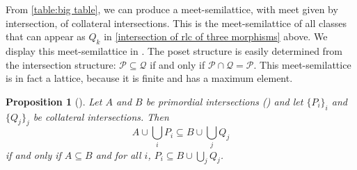 \documentclass{amsart}
\newcommand{\computerassisted}{\faLaptopCode}
\numberwithin{equation}{section}
\newtheorem{proposition}[equation]{Proposition}
\theoremstyle{definition}
\begin{document}
\vspace*{-3mm}

From \cref{table:big table}, we can produce a meet-semilattice, with meet given by intersection, of collateral intersections. This is the meet-semilattice of all classes that can appear as $Q_k$ in \cref{intersection of rlc of three morphisms} above. We display this meet-semilattice in . The poset structure is easily determined from the intersection structure: $\mathcal P \subseteq \mathcal Q$ if and only if $\mathcal P \cap \mathcal Q = \mathcal P$. This meet-semilattice is in fact a lattice, because it is finite and has a maximum element.

\begin{proposition}[\computerassisted]
	\label{ordering on mixed intersections}
	Let $A$ and $B$ be primordial intersections () and let $\{P_i\}_i$ and $\{Q_j\}_j$ be collateral intersections. Then
	\[
		A \cup \bigcup_i P_i \subseteq B \cup \bigcup_j Q_j
	\]
	if and only if $A \subseteq B$ and for all $i$, $P_i \subseteq B \cup \bigcup_j Q_j$.
\end{proposition}
\end{document}

